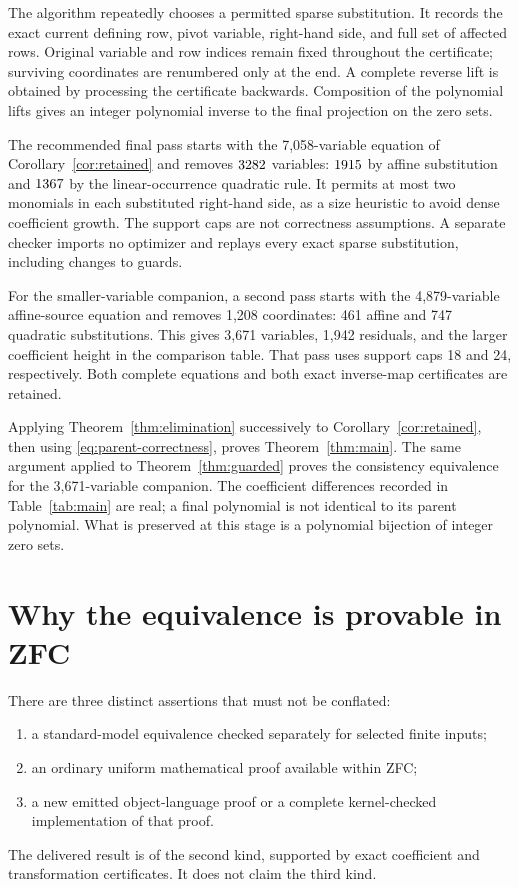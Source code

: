 \documentclass[11pt,letterpaper]{article}
\theoremstyle{definition}
\begin{document}
The algorithm repeatedly chooses a permitted sparse substitution. It
records the exact current defining row, pivot variable, right-hand
side, and full set of affected rows. Original variable and row indices
remain fixed throughout the certificate; surviving coordinates are
renumbered only at the end. A complete reverse lift is obtained by
processing the certificate backwards. Composition of the polynomial
lifts gives an integer polynomial inverse to the final projection on
the zero sets.

The recommended final pass starts with the 7,058-variable equation
of Corollary~\ref{cor:retained} and removes $3282$ variables:
$1915$ by affine substitution and $1367$ by the
linear-occurrence quadratic rule. It permits at most two monomials
in each substituted right-hand side, as a size heuristic to avoid
dense coefficient growth. The support caps are not
correctness assumptions. A separate checker imports no optimizer and
replays every exact sparse substitution, including changes to guards.

For the smaller-variable companion, a second pass starts with the
4,879-variable affine-source equation and removes 1,208 coordinates:
461 affine and 747 quadratic substitutions. This gives 3,671 variables,
1,942 residuals, and the larger coefficient height in the comparison
table. That pass uses support caps 18 and 24, respectively. Both complete
equations and both exact inverse-map certificates are retained.

Applying Theorem~\ref{thm:elimination} successively to
Corollary~\ref{cor:retained}, then using
\eqref{eq:parent-correctness}, proves Theorem~\ref{thm:main}. The
same argument applied to Theorem~\ref{thm:guarded} proves the
consistency equivalence for the 3,671-variable companion. The
coefficient differences recorded in Table~\ref{tab:main} are real; a final
polynomial is not identical to its parent polynomial. What is preserved
at this stage is a polynomial bijection of integer zero sets.

\section{Why the equivalence is provable in ZFC}
\label{sec:internal}

There are three distinct assertions that must not be conflated:
\begin{enumerate}
\item a standard-model equivalence checked separately for selected
    finite inputs;
\item an ordinary uniform mathematical proof available within ZFC;
\item a new emitted object-language proof or a complete kernel-checked
    implementation of that proof.
\end{enumerate}
The delivered result is of the second kind, supported by exact
coefficient and transformation certificates. It does not claim the
third kind.
\end{document}
